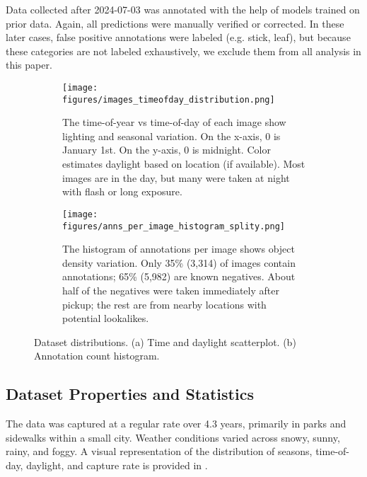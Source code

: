 \documentclass{article}
\begin{document}
Data collected after 2024-07-03 was annotated with the help of models trained
on prior data. Again, all predictions were manually verified or corrected. In
these later cases, false positive annotations were labeled (e.g. stick, leaf),
but because these categories are not labeled exhaustively, we exclude them from
all analysis in this paper.


\begin{figure}[t]
\centering
\begin{subfigure}[t]{0.48\textwidth}
    \centering
    \texttt{[image: figures/images\_timeofday\_distribution.png]}
    \caption{
        The time-of-year vs time-of-day of each image show lighting and seasonal
        variation.  On the x-axis, 0 is January 1st. On the y-axis, 0 is
        midnight.  Color estimates daylight based on location (if available).
        Most images are in the day, but many were taken at night with flash or
        long exposure.
    }
    \label{fig:TimeOfDayDistribution}
\end{subfigure}
\hfill
\begin{subfigure}[t]{0.48\textwidth}
    \centering
    \texttt{[image: figures/anns\_per\_image\_histogram\_splity.png]}
    \caption{
        The histogram of annotations per image shows object density variation.
        Only 35\% (3,314) of images contain annotations; 65\% (5,982) are known negatives.
        About half of the negatives were taken immediately after pickup; the
        rest are from nearby locations with potential lookalikes.
    }
    \label{fig:AnnotsPerImage}
\end{subfigure}
\caption{Dataset distributions. (a) Time and daylight scatterplot. (b) Annotation count histogram.}
\label{fig:TimeAndAnnots}
\end{figure}



\subsection{Dataset Properties and Statistics}
\label{subsec:datastat}



The data was captured at a regular rate over 4.3 years, primarily in parks and sidewalks within a small
  city.
Weather conditions varied across snowy, sunny, rainy, and foggy.
A visual representation of the distribution of seasons, time-of-day, daylight, and capture rate is provided
  in .
\end{document}
